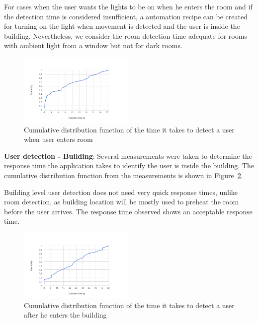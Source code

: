 \documentclass[conference]{IEEEtran}
\begin{document}
For cases when the user wants the lights to be on when he enters the room and if the detection time is considered insufficient, a automation recipe can be created for turning on the light when movement is detected and the user is inside the building. Nevertheless, we consider the room detection time adequate for rooms with ambient light from a window but not for dark rooms.


\begin{figure}[]
\centering
\includegraphics[width=0.5\textwidth]{Figures/room_detection_cumulative2}
\caption{Cumulative distribution function of the time it takes to detect a user when user enters room}
\label{eval:room2}
\end{figure}


\textbf{User detection - Building}: Several measurements were taken to determine the response time the application takes to identify the user is inside the building. The cumulative distribution function from the measurements is shown in Figure~\ref{eval:building1}.

Building level user detection does not need very quick response times, unlike room detection, as building location will be mostly used to preheat the room before the user arrives. The response time observed shows an acceptable response time.


\begin{figure}[]
\centering
\includegraphics[width=0.5\textwidth]{Figures/building_detection_cumulative}
\caption{Cumulative distribution function of the time it takes to detect a user  after he enters the building}
\label{eval:building1}
\end{figure}
\end{document}
